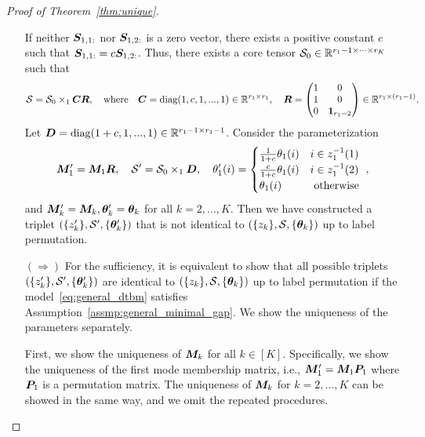 \documentclass[lettersize,journal]{IEEEtran}
\theoremstyle{definition}
\theoremstyle{definition}
\newcommand{\of}[1]{\left(#1\right)}
\begin{document}
\begin{proof}[Proof of Theorem~\ref{thm:unique}]
\begin{enumerate}
If neither $\bm S_{1,1:}$ nor $\bm S_{1,2:}$ is a zero vector, there exists a positive constant $c$ such that $\bm S_{1,1:} = c \bm S_{1,2:}$. Thus, there exists a core tensor $\mathcal{S}_0 \in \mathbb{R}^{r_1 -1 \times \cdots \times r_K}$ such that 
\begin{equation}
    \mathcal{S} = \mathcal{S}_0 \times_1 \bm C \bm{R}, \quad \text{where} \quad \bm C = \text{diag}(1, c, 1,...,1) \in \mathbb{R}^{r_1 \times r_1}, \quad \bm{R} = \begin{pmatrix}
    1& 0\\
    1&0 \\
    0 & \mathbf{1}_{r_1-2}
    \end{pmatrix} \in \mathbb{R}^{r_1 \times (r_1 -1)}.
\end{equation}
Let $\bm{D} = \text{diag}(1+c, 1,...,1) \in \mathbb{R}^{r_1 -1 \times r_1 -1}$. Consider the parameterization
\begin{equation}
    \bm M'_1 = \bm M_1 \bm{R}, \quad \mathcal{S}' = \mathcal{S}_0 \times_1 \bm{D}, \quad \theta'_{1}(i) = \begin{cases}
    \frac{1}{1+c} \theta_{1}(i) & i \in z_{1}^{-1}(1)\\
     \frac{c}{1+c} \theta_{1}(i) & i \in z_{1}^{-1}(2)\\
     \theta_{1}(i) & \text{ otherwise }
    \end{cases},
\end{equation}
and $\bm M'_k = \bm M_k, \boldsymbol{\theta}'_k = \boldsymbol{\theta}_k$ for all $k = 2, \ldots, K$. Then we have constructed a
triplet $\of{ \{z'_k\}, \tS', \{ \mtheta'_k \} }$ that is not identical to $\of{ \{z_k\}, \tS, \{ \mtheta_k \} }$ up to label permutation. 

\item[$(\Rightarrow)$] For the sufficiency, it is equivalent to show that all possible triplets $\of{ \{z'_k\}, \tS', \{ \mtheta'_k \} }$ are identical to $\of{ \{z_k\}, \tS, \{ \mtheta_k \} }$ up to label permutation if the model~\eqref{eq:general_dtbm} satisfies Assumption~\eqref{assmp:general_minimal_gap}. We show the uniqueness of the parameters separately.


First, we show the uniqueness of $\bm M_k$ for all $k \in [K]$. Specifically, we show the uniqueness of the first mode membership matrix, i.e., $\bm M'_1 = \bm M_1\bm{P}_1$ where $\bm{P}_1$ is a permutation matrix. The uniqueness of $\bm M_k$ for $k = 2,\ldots, K$ can be showed in the same way, and we omit the repeated procedures.


\end{enumerate}
\end{proof}
\end{document}
